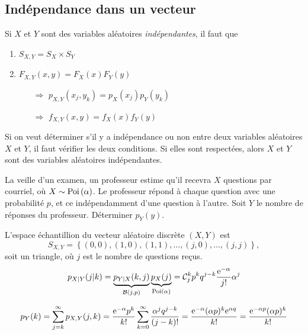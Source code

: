 \documentclass[11pt]{article}
\newcommand\comb[2]{%
	\ensuremath{%
		\mathcal{C}_{#2}^{#1}%
	}%
}%
\newcommand\e{%
	\ensuremath{%
		\mathrm{e}%
	}%
}%
\newcommand\Bin[2]{%
	\ensuremath{%
		\mathcal{B}\left(#1,#2\right)%
	}%
}%
\newcommand\Poi[1]{%
	\ensuremath{%
		\mathrm{Poi}\left(#1\right)%
	}%
}%
\begin{document}
\subsection{Indépendance dans un vecteur}
\begin{definition}
	Si $X$ et $Y$ sont des variables aléatoires \textit{indépendantes}, il faut
	que
	\begin{enumerate}
		\item $S_{X,Y}=S_X\times S_Y$
		\item $F_{X,Y}(x,y)=F_X(x)F_Y(y)$
		\begin{itemize}
			\item[$\Rightarrow$] $p_{X,Y}(x_j,y_k)=p_X(x_j)p_Y(y_k)$
			\item[$\Rightarrow$] $f_{X,Y}(x,y)=f_X(x)f_Y(y)$
		\end{itemize}
	\end{enumerate}
\end{definition}

Si on veut déterminer s'il y a indépendance ou non entre deux variables
aléatoires $X$ et $Y$, il faut vérifier les deux conditions. Si elles sont
respectées, alors $X$ et $Y$ sont des variables aléatoires indépendantes.

\begin{exemple}
	La veille d'un examen, un professeur estime qu'il recevra $X$ questions par
	courriel, où $X\sim\Poi{\alpha}$. Le professeur répond à chaque question
	avec une probabilité $p$, et ce indépendamment d'une question à l'autre.
	Soit $Y$ le nombre de réponses du professeur. Déterminer $p_Y(y)$.

	L'espace échantillion du vecteur aléatoire discrète $(X,Y)$ est
	\begin{equation*}
		S_{X,Y}=\left\{(0,0),(1,0),(1,1),\dots,(j,0),\dots,(j,j)\right\},
	\end{equation*}
	soit un triangle, où $j$ est le nombre de questions reçus.
	\begin{equation*}
		p_{X|Y}(j|k)
		=\underbrace{p_{Y|X}(k,j)}_{\Bin{j}{p}}
		 \underbrace{p_X(j)}_{\Poi{\alpha}}
		=\comb{k}{j}p^kq^{j-k}\frac{\e^{-\alpha}}{j!}\alpha^j
	\end{equation*}

	\begin{equation*}
		p_Y(k)
		=\sum_{j=k}^\infty p_{X,Y}(j,k)
		=\frac{\e^{-\alpha}p^k}{k!}
		 \sum_{k=0}^\infty\frac{\alpha^jq^{j-k}}{(j-k)!}
		=\frac{\e^{-\alpha}(\alpha p)^k\e^{\alpha q}}{k!}
		=\frac{\e^{-\alpha p}(\alpha p)^k}{k!}
	\end{equation*}
\end{exemple}
\end{document}
